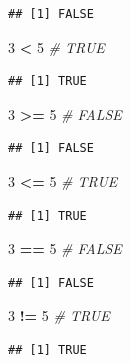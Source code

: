 \documentclass[
]{book}
\newenvironment{Shaded}{\begin{snugshade}}{\end{snugshade}}
\newcommand{\CommentTok}[1]{\textcolor[rgb]{0.56,0.35,0.01}{\textit{#1}}}
\newcommand{\DecValTok}[1]{\textcolor[rgb]{0.00,0.00,0.81}{#1}}
\newcommand{\SpecialCharTok}[1]{\textcolor[rgb]{0.81,0.36,0.00}{\textbf{#1}}}
\begin{document}
\begin{verbatim}
## [1] FALSE
\end{verbatim}

\begin{Shaded}
\begin{Highlighting}[]
\DecValTok{3} \SpecialCharTok{\textless{}} \DecValTok{5}  \CommentTok{\# TRUE}
\end{Highlighting}
\end{Shaded}

\begin{verbatim}
## [1] TRUE
\end{verbatim}

\begin{Shaded}
\begin{Highlighting}[]
\DecValTok{3} \SpecialCharTok{\textgreater{}=} \DecValTok{5} \CommentTok{\# FALSE}
\end{Highlighting}
\end{Shaded}

\begin{verbatim}
## [1] FALSE
\end{verbatim}

\begin{Shaded}
\begin{Highlighting}[]
\DecValTok{3} \SpecialCharTok{\textless{}=} \DecValTok{5} \CommentTok{\# TRUE}
\end{Highlighting}
\end{Shaded}

\begin{verbatim}
## [1] TRUE
\end{verbatim}

\begin{Shaded}
\begin{Highlighting}[]
\DecValTok{3} \SpecialCharTok{==} \DecValTok{5} \CommentTok{\# FALSE}
\end{Highlighting}
\end{Shaded}

\begin{verbatim}
## [1] FALSE
\end{verbatim}

\begin{Shaded}
\begin{Highlighting}[]
\DecValTok{3} \SpecialCharTok{!=} \DecValTok{5} \CommentTok{\# TRUE}
\end{Highlighting}
\end{Shaded}

\begin{verbatim}
## [1] TRUE
\end{verbatim}
\end{document}
